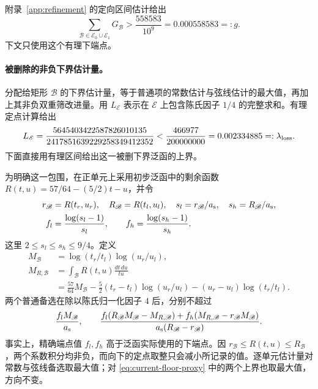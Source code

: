 附录~\ref{app:refinement} 的定向区间估计给出
\begin{equation}
 \sum_{\mathscr B\in \mathscr E_0\cup \mathscr E_1}G_{\mathscr B}>
 \frac{558583}{10^9}=0.000558583=:g.
 \label{eq:current-extra-gross}
\end{equation}
下文只使用这个有理下端点。

\paragraph{被删除的非负下界估计量。}
分配给矩形 $\mathscr B$ 的下界估计量，等于普通项的常数估计与弦线估计的最大值，再加上其非负双重筛改进量。用 $L_{\mathscr E}$ 表示在 $\mathscr E$ 上包含陈氏因子 $1/4$ 的完整求和。有理定点计算给出
\begin{equation}
 L_{\mathscr E}=\frac{5645403422587826010135}{2417851639229258349412352}
 <\frac{466977}{200000000}=0.002334885=:\lambda_{\rm loss}.
 \label{eq:current-literal-loss}
\end{equation}
下面直接用有理区间给出这一被删下界泛函的上界。

为明确这一包围，在正单元上采用初步泛函中的剩余函数 $R(t,u)=57/64-(5/2)t-u$，并令
\begin{align*}
 r_{\mathscr B}&=R(t_r,u_r),\quad R_{\mathscr B}=R(t_l,u_l),\quad
 s_l=r_{\mathscr B}/{a_{\rm s}},\quad s_h=R_{\mathscr B}/{a_{\rm s}},\\
 f_l&=\frac{\log(s_l-1)}{s_l},\qquad
 f_h=\frac{\log(s_h-1)}{s_h}.
\end{align*}
这里 $2\le s_l\le s_h\le9/4$。定义
\begin{align*}
 M_{\mathscr B}&=\log(t_r/t_l)\log(u_r/u_l),\\
 M_{R,\mathscr B}
 &=\int_{\mathscr B} R(t,u)\frac{dt\,du}{tu}\\
 &=\frac{57}{64}M_{\mathscr B}
   -\frac52(t_r-t_l)\log(u_r/u_l)
   -(u_r-u_l)\log(t_r/t_l).
\end{align*}
两个普通备选在除以陈氏归一化因子 $4$ 后，分别不超过
\begin{equation}
 \frac{f_lM_{\mathscr B}}{{a_{\rm s}}},
 \qquad
 \frac{f_l(R_{\mathscr B}M_{\mathscr B}-M_{R,\mathscr B})+
       f_h(M_{R,\mathscr B}-r_{\mathscr B}M_{\mathscr B})}{a_{\rm s}(R_{\mathscr B}-r_{\mathscr B})}.
 \label{eq:current-floor-proxy}
\end{equation}
事实上，精确端点值 $f_l,f_h$ 高于泛函实际使用的下端点。因 $r_{\mathscr B}\le R(t,u)\le R_{\mathscr B}$，两个系数积分均非负，而向下的定点取整只会减小所记录的值。逐单元估计量对常数与弦线备选取最大值；对 \eqref{eq:current-floor-proxy} 中的两个上界也取最大值，方向不变。

